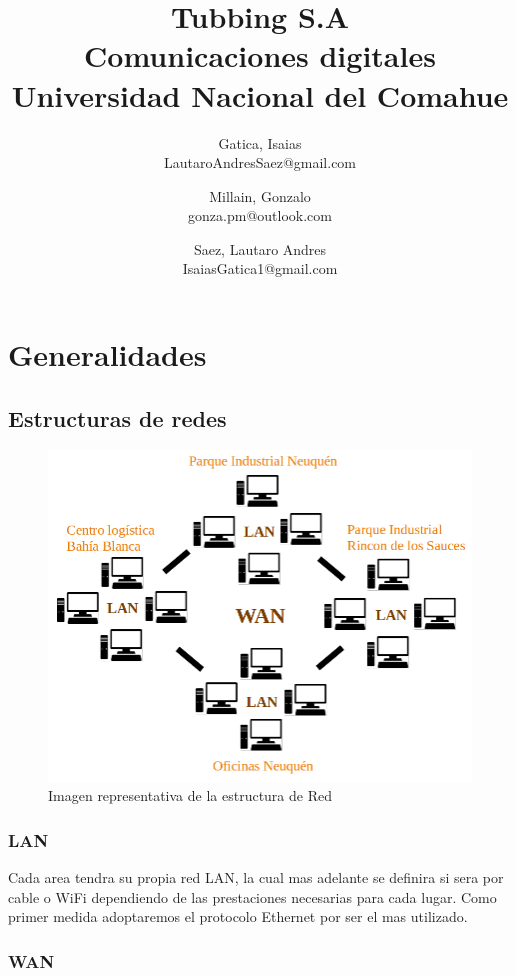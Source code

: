 \documentclass[11pt]{article}
\title{Tubbing S.A \\ \small{Comunicaciones digitales} \\ \small{Universidad Nacional del Comahue} }
\author{ 
        Gatica, Isaias \\ \small{LautaroAndresSaez@gmail.com} \and 
        Millain, Gonzalo \\ \small{gonza.pm@outlook.com} \and
        Saez, Lautaro Andres \\ \small{IsaiasGatica1@gmail.com} 

}
\date{}
\begin{document}
    \maketitle
    \section{Generalidades}
    
        \subsection{Estructuras de redes}
        \begin{figure}[H]
            \centering
            \includegraphics[scale=0.5]{Figure/Tubbin_Estructura.PNG}
            \caption{Imagen representativa de la estructura de Red}
            \label{Estructura}
        \end{figure}


        \subsubsection*{LAN}

        Cada area tendra su propia red LAN, la cual mas adelante se definira si sera por cable o WiFi dependiendo de las 
        prestaciones necesarias para cada lugar. Como primer medida adoptaremos el protocolo Ethernet por ser el mas utilizado.

        \subsubsection*{WAN}
\end{document}
